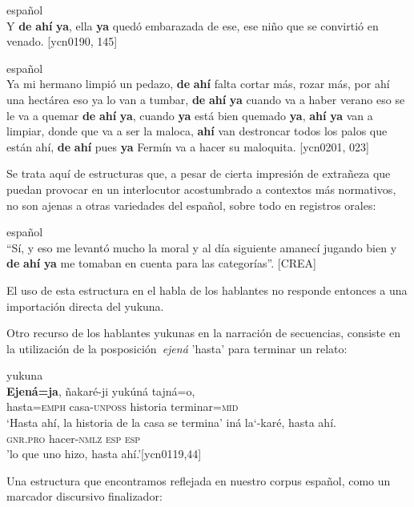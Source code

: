 \documentclass[output=paper]{langscibook}
\begin{document}
\ea
{español}\\
Y \textbf{de} \textbf{ahí} \textbf{ya}, ella \textbf{ya} quedó embarazada de ese, ese niño que se convirtió en venado. {[ycn0190, 145]}\\
\z

\ea
{español}\\
Ya mi hermano limpió un pedazo, \textbf{de} \textbf{ahí} falta cortar más, rozar más, por ahí una hectárea eso ya lo van a tumbar, \textbf{de} \textbf{ahí} \textbf{ya} cuando va a haber verano eso se le va a quemar \textbf{de} \textbf{ahí} \textbf{ya}, cuando \textbf{ya} está bien quemado \textbf{ya}, \textbf{ahí} \textbf{ya} van a limpiar, donde que va a ser la maloca, \textbf{ahí} van destroncar todos los palos que están ahí, \textbf{de} \textbf{ahí} pues \textbf{ya} Fermín va a hacer su maloquita. {[ycn0201, 023]}\\
\z

Se trata aquí de estructuras que, a pesar de cierta impresión de extrañeza que puedan provocar en un interlocutor acostumbrado a contextos más normativos, no son ajenas a otras variedades del español, sobre todo en registros orales:

\ea
{español}\\
“Sí, y eso me levantó mucho la moral y al día siguiente amanecí jugando bien y \textbf{de} \textbf{ahí} \textbf{ya} me tomaban en cuenta para las categorías”. {\citep{RAE2020}} {[CREA]}\\
\z

El uso de esta estructura en el habla de los hablantes no responde entonces a una importación directa del yukuna.

Otro recurso de los hablantes yukunas en la narración de secuencias, consiste en la utilización de la posposición~\textit{ejená} 'hasta' para terminar un relato: 

\ea
{yukuna}\\
\ea
\gll \textbf{Ejená=ja},   ñakaré-ji   yukúná   tajná=o, \\
      hasta=\textsc{emph}  casa-\textsc{unposs}  historia  terminar=\textsc{mid}\\
\glt ‘Hasta ahí, la historia de la casa se termina'
\ex
\gll iná     la‘-karé,   hasta     ahí.\\
      \textsc{gnr.pro}  hacer\textsc{-nmlz}   \textsc{esp}         \textsc{esp}\\
\glt 'lo que uno hizo, hasta ahí.’[ycn0119,44]
\z
\z

Una estructura que encontramos reflejada en nuestro corpus español, como un marcador discursivo finalizador:
\end{document}

